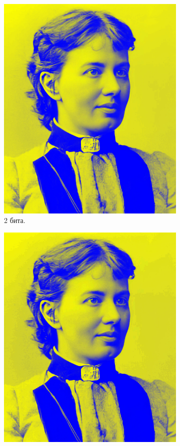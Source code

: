 \documentclass[11pt,a4paper,final]{article} %
\begin{document}
\begin{figure}[h!]
\begin{subfigure}[b]{0.3\linewidth}
		\includegraphics[width=\linewidth]{img/sofya2-2-5.jpg}
		\caption{2 бита.}
		\label{fig:s2}
	\end{subfigure}
	\hfill
	\begin{subfigure}[b]{0.3\linewidth}
		\centering
		\includegraphics[width=\linewidth]{img/sofya2-3-5.jpg}

\end{subfigure}
\end{figure}
\end{document}
